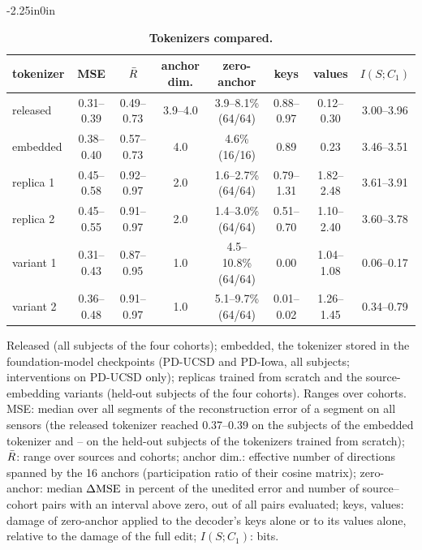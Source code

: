\begin{table}[!ht]
\begin{adjustwidth}{-2.25in}{0in}
\renewcommand{\baselinestretch}{1}
\caption{{\bf Tokenizers compared.}}
\label{tab:replication}
\centering\scriptsize
\setlength{\tabcolsep}{2pt}
\begin{tabular}{lccccccc}
\toprule
\textbf{tokenizer} & \textbf{MSE} & $\bar{R}$ & \textbf{anchor dim.} & \textbf{zero-anchor} & \textbf{keys} & \textbf{values} & $I(S;C_1)$ \\
\midrule
released & 0.31--0.39 & 0.49--0.73 & 3.9--4.0 & 3.9--8.1\% (64/64) & 0.88--0.97 & 0.12--0.30 & 3.00--3.96 \\
embedded & 0.38--0.40 & 0.57--0.73 & 4.0 & 4.6\% (16/16) & 0.89 & 0.23 & 3.46--3.51 \\
replica 1 & 0.45--0.58 & 0.92--0.97 & 2.0 & 1.6--2.7\% (64/64) & 0.79--1.31 & 1.82--2.48 & 3.61--3.91 \\
replica 2 & 0.45--0.55 & 0.91--0.97 & 2.0 & 1.4--3.0\% (64/64) & 0.51--0.70 & 1.10--2.40 & 3.60--3.78 \\
variant 1 & 0.31--0.43 & 0.87--0.95 & 1.0 & 4.5--10.8\% (64/64) & 0.00 & 1.04--1.08 & 0.06--0.17 \\
variant 2 & 0.36--0.48 & 0.91--0.97 & 1.0 & 5.1--9.7\% (64/64) & 0.01--0.02 & 1.26--1.45 & 0.34--0.79 \\
\bottomrule
\end{tabular}
\begin{flushleft}\footnotesize Released (all subjects of the four cohorts); embedded, the tokenizer stored in the foundation-model checkpoints (PD-UCSD and PD-Iowa, all subjects; interventions on PD-UCSD only); replicas trained from scratch and the source-embedding variants (held-out subjects of the four cohorts). Ranges over cohorts. MSE: median over all segments of the reconstruction error of a segment on all sensors (the released tokenizer reached 0.37--0.39 on the subjects of the embedded tokenizer and \RepReleasedMSEMin--\RepReleasedMSEMax{} on the held-out subjects of the tokenizers trained from scratch); $\bar{R}$: range over sources and cohorts; anchor dim.: effective number of directions spanned by the 16 anchors (participation ratio of their cosine matrix); zero-anchor: median $\Delta\mathrm{MSE}$ in percent of the unedited error and number of source--cohort pairs with an interval above zero, out of all pairs evaluated; keys, values: damage of zero-anchor applied to the decoder's keys alone or to its values alone, relative to the damage of the full edit; $I(S;C_1)$: bits.\end{flushleft}
\end{adjustwidth}
\end{table}
